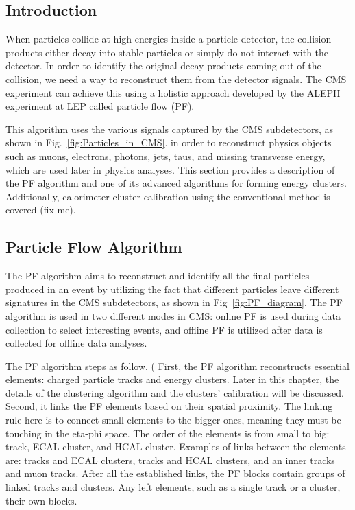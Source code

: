\subsection{Introduction}
When particles collide at high energies inside a particle detector, the collision products either decay into stable particles or simply do not interact with the detector.
In order to identify the original decay products coming out of the collision, we need a way to reconstruct them from the detector signals.
The CMS experiment can achieve this using a holistic approach developed by the ALEPH experiment at LEP called particle flow (PF).

This algorithm uses the various signals captured by the CMS subdetectors, as shown in Fig.~\ref{fig:Particles_in_CMS}. %
in order to reconstruct physics objects such as muons, electrons, photons, jets, taus, and missing transverse energy, which are used later in physics analyses.
This section provides a description of the PF algorithm and one of its advanced algorithms for forming energy clusters. Additionally, calorimeter cluster calibration using the conventional method is covered (fix me).

\subsection{Particle Flow Algorithm}
The PF algorithm aims to reconstruct and identify all the final particles produced in an event by utilizing the fact that different particles leave different signatures in the CMS subdetectors, as shown in Fig~\ref{fig:PF_diagram}. %
The PF algorithm is used in two different modes in CMS: online PF is used during data collection to select interesting events, and offline PF is utilized after data is collected for offline data analyses. %

The PF algorithm steps as follow. (%
First, the PF algorithm reconstructs essential elements: charged particle tracks and energy clusters.
Later in this chapter, the details of the clustering algorithm and the clusters' calibration will be discussed.
Second, it links the PF elements based on their spatial proximity.
The linking rule here is to connect small elements to the bigger ones, meaning they must be touching in the eta-phi space.
The order of the elements is from small to big: track, ECAL cluster, and HCAL cluster.
Examples of links between the elements are: tracks and ECAL clusters, tracks and HCAL clusters, and an inner tracks and muon tracks.
After all the established links, the PF blocks contain groups of linked tracks and clusters.
Any left elements, such as a single track or a cluster,  their own blocks.

